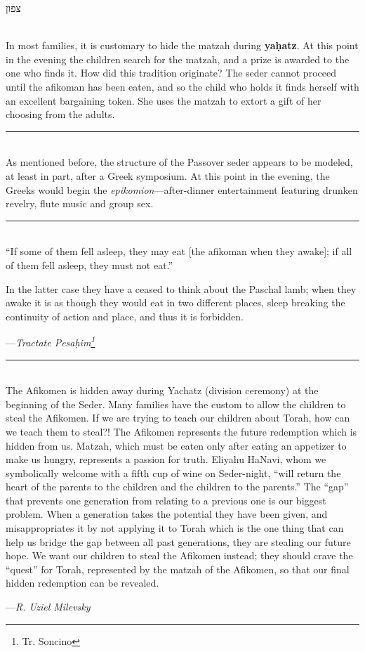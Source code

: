 \documentclass[letter,11pt,openany]{memoir}
\newcommand{\HgSource}[1]{\hfill{\small---\itshape{#1}}}
\newcommand{\hchapter}[1]{
  \begin{hebrew}
    \begin{Spacing}{.97}
      \newpage
      \strut

      \vspace{.15em}

      \begin{flushleft}
      \noindent\Huge #1
      \end{flushleft}

      \vspace{1em}
    \end{Spacing}
  \end{hebrew}
}
\newcommand{\HgFill}{\vfill \hrule \vfill}
\newenvironment{HgEnglish}{\strut\\\noindent}{\vspace{1em}}
\begin{document}
\vfill

\hchapter{צפון}

\begin{HgEnglish}
In most families, it is customary to hide the matzah during {\bfseries
ya\d{h}atz}. At this point in the evening the children search for the matzah,
and a prize is awarded to the one who finds it.
%
How did this tradition originate? The seder cannot proceed until
the afikoman has been eaten, and so the child who holds it finds herself with an
excellent bargaining token. She uses the matzah to extort a gift of her choosing
from the adults.
\end{HgEnglish}

\HgFill

\begin{HgEnglish}
  As mentioned before, the structure of the Passover seder appears to be
  modeled, at least in part, after a Greek symposium. At this point in the
  evening, the Greeks would begin the {\itshape epikomion}---after-dinner
  entertainment featuring drunken revelry, flute music and group sex.
\end{HgEnglish}

\HgFill

\begin{HgEnglish}
``If some of them fell asleep, they may eat [the afikoman when they awake]; if
all of them fell asleep, they must not eat.''

In the latter case they have a ceased to think about the Paschal lamb; when they
awake it is as though they would eat in two different places, sleep breaking the
continuity of action and place, and thus it is forbidden.

\HgSource{Tractate Pesa\d{h}im\footnote{Tr. Soncino}}\\
\end{HgEnglish}

\HgFill

\begin{HgEnglish}
The Afikomen is hidden away during Yachatz (division ceremony) at the beginning
of the Seder. Many families have the custom to allow the children to steal the
Afikomen. If we are trying to teach our children about Torah, how can we teach
them to steal?! The Afikomen represents the future redemption which is hidden
from us. Matzah, which must be eaten only after eating an appetizer to make us
hungry, represents a passion for truth. Eliyahu HaNavi, whom we symbolically
welcome with a fifth cup of wine on Seder-night, ``will return the heart of the
parents to the children and the children to the parents.'' The ``gap'' that
prevents one generation from relating to a previous one is our biggest problem.
When a generation takes the potential they have been given, and misappropriates
it by not applying it to Torah which is the one thing that can help us bridge
the gap between all past generations, they are stealing our future hope. We want
our children to steal the Afikomen instead; they should crave the ``quest'' for
Torah, represented by the matzah of the Afikomen, so that our final hidden
redemption can be revealed. 

\HgSource{R. Uziel Milevsky}
\end{HgEnglish}
\end{document}

